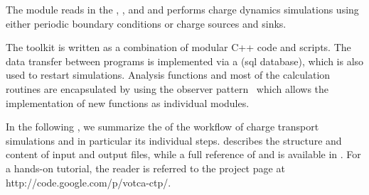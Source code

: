 The   module reads in the , , and  and performs charge dynamics simulations using either periodic boundary conditions or charge sources and sinks. 

The toolkit is written as a combination of modular C++ code and scripts. The data transfer between programs is implemented via a  (sql database), which is also used to restart simulations. Analysis functions and most of the calculation routines are encapsulated by using the observer pattern~\cite{gamma_design_1995} which allows the implementation of new functions as individual modules.

In the following , we summarize the  of the workflow of charge transport simulations and in particular its individual steps.  describes the structure and content of input and output files, while a full reference of  and  is available in . For a hands-on tutorial, the reader is referred to the \hyperref[http://code.google.com/p/votca-ctp/]{\votcactp} project page at http://code.google.com/p/votca-ctp/.




